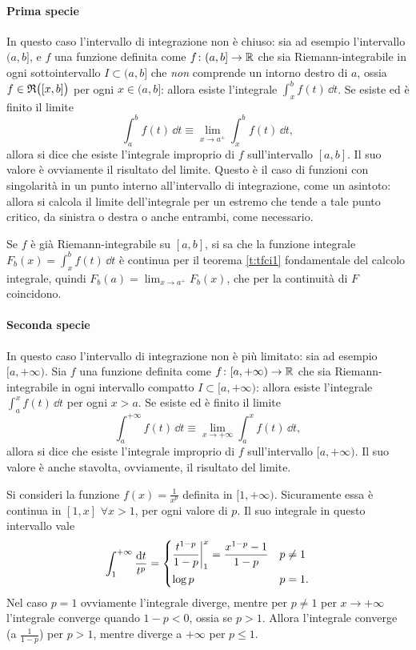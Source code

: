\paragraph{Prima specie}
In questo caso l'intervallo di integrazione non è chiuso: sia ad esempio l'intervallo $(a,b]$, e $f$ una funzione definita come $f\colon(a,b]\to\mathbb{R}$ che sia Riemann-integrabile in ogni sottointervallo $I\subset(a,b]$ che \emph{non} comprende un intorno destro di $a$, ossia $f\in\mathfrak{R}\big([x,b]\big)$ per ogni $x\in(a,b]$: allora esiste l'integrale $\int_x^bf(t)\,\dd t$.  Se esiste ed è finito il limite
\[
\int_a^bf(t)\,\dd t\equiv\lim_{x\to a^+}\int_x^bf(t)\,\dd t,
\]
allora si dice che esiste l'integrale improprio di $f$ sull'intervallo $[a,b]$. Il suo valore è ovviamente il risultato del limite.
Questo è il caso di funzioni con singolarità in un punto interno all'intervallo di integrazione, come un asintoto: allora si calcola il limite dell'integrale per un estremo che tende a tale punto critico, da sinistra o destra o anche entrambi, come necessario.
\begin{osservazione}
Se $f$ è già Riemann-integrabile su $[a,b]$, si sa che la funzione integrale $F_b(x)=\int_x^bf(t)\,\dd t$ è continua per il teorema \ref{t:tfci1} fondamentale del calcolo integrale, quindi $F_b(a)=\lim_{x\to a^+}F_b(x)$, che per la continuità di $F$ coincidono.
\end{osservazione}
\paragraph{Seconda specie}
In questo caso l'intervallo di integrazione non è più limitato: sia ad esempio $[a,+\infty)$.
Sia $f$ una funzione definita come $f\colon[a,+\infty)\to\mathbb{R}$ che sia Riemann-integrabile in ogni intervallo compatto $I\subset[a,+\infty)$: allora esiste l'integrale $\int_a^xf(t)\,\dd t$ per ogni $x>a$.
Se esiste ed è finito il limite
\[
\int_a^{+\infty} f(t)\,\dd t\equiv\lim_{x\to+\infty}\int_a^xf(t)\,\dd t,
\]
allora si dice che esiste l'integrale improprio di $f$ sull'intervallo $[a,+\infty)$. Il suo valore è anche stavolta, ovviamente, il risultato del limite.

Si consideri la funzione $f(x)=\frac1{x^p}$ definita in $[1,+\infty)$. Sicuramente essa è continua in $[1,x]$ $\forall x>1$, per ogni valore di $p$. Il suo integrale in questo intervallo vale
\[
\int_1^{+\infty}\frac{\textup{d} t}{t^p}=
\begin{dcases}
	\frac{t^{1-p}}{1-p}\bigg|_1^x=\frac{x^{1-p}-1}{1-p}	&p\neq 1\\
	\log p											&p=1.
\end{dcases}
\]
Nel caso $p=1$ ovviamente l'integrale diverge, mentre per $p\neq 1$ per $x\to+\infty$ l'integrale converge quando $1-p<0$, ossia se $p>1$.
Allora l'integrale converge (a $\frac1{1-p}$) per $p>1$, mentre diverge a $+\infty$ per $p\leq 1$.

